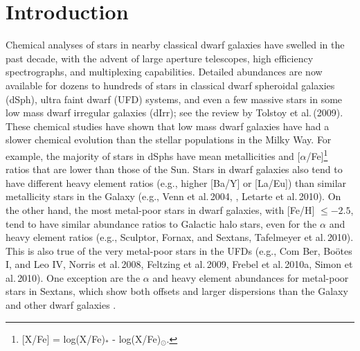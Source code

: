 \documentclass{emulateapj}
\newcommand\etal{{\rm et al.\,}}
\begin{document}
\section{Introduction} 

Chemical analyses of stars in nearby classical dwarf galaxies have
swelled in the past decade, with the advent of large aperture 
telescopes, high efficiency spectrographs, and multiplexing 
capabilities.    
%
%
Detailed abundances are now available for dozens to hundreds of 
stars in classical dwarf spheroidal galaxies (dSph), 
ultra faint dwarf (UFD) systems, and even a few massive
stars in some low mass dwarf irregular galaxies (dIrr);
see the review by Tolstoy \etal (2009).
%
These chemical studies have shown that 
low mass dwarf galaxies have had a slower chemical 
evolution than the stellar populations in the Milky Way.
For example, the majority of stars in dSphs have mean 
metallicities and [$\alpha$/Fe]\footnote{ 
[X/Fe] = log(X/Fe)$_*$ - log(X/Fe)$_\odot$.}
ratios that are lower than those of the Sun. 
Stars in dwarf galaxies also tend to have different 
heavy element ratios (e.g., higher [Ba/Y] or [La/Eu])
than similar metallicity stars in the Galaxy 
(e.g., Venn \etal 2004, \citealt{Aoki09}, Letarte \etal  2010).  
%
On the other hand, the most metal-poor stars in dwarf galaxies, 
with [Fe/H] $\le -2.5$, tend to have similar abundance ratios 
to Galactic halo stars, even for the $\alpha$ and heavy element 
ratios
(e.g., Sculptor, Fornax, and Sextans, Tafelmeyer \etal  2010).   
%
This is also true of the very metal-poor stars in the UFDs 
(e.g., Com Ber, Bo\"otes I, and Leo IV, Norris \etal 2008, 
Feltzing \etal 2009,  Frebel \etal 2010a, Simon \etal 2010). 
One exception are the $\alpha$ and heavy element abundances
for metal-poor stars in Sextans, which show both offsets and 
larger dispersions than the Galaxy and other dwarf galaxies 
\citep{Aoki09}. 
\end{document}
